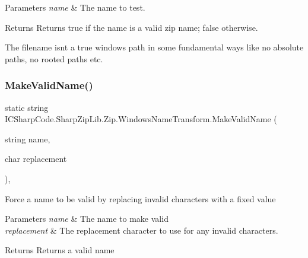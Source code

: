 \begin{DoxyParams}{Parameters}
{\em name} & The name to test.\\
\hline
\end{DoxyParams}
\begin{DoxyReturn}{Returns}
Returns true if the name is a valid zip name; false otherwise.
\end{DoxyReturn}


The filename isnt a true windows path in some fundamental ways like no absolute paths, no rooted paths etc.\mbox{\label{class_i_c_sharp_code_1_1_sharp_zip_lib_1_1_zip_1_1_windows_name_transform_af79a913adc32852ac1ba2acdc0394f69}} 
\subsubsection{\texorpdfstring{Make\+Valid\+Name()}{MakeValidName()}}
{\footnotesize\ttfamily static string I\+C\+Sharp\+Code.\+Sharp\+Zip\+Lib.\+Zip.\+Windows\+Name\+Transform.\+Make\+Valid\+Name (\begin{DoxyParamCaption}\item[{string}]{name,  }\item[{char}]{replacement }\end{DoxyParamCaption})\hspace{0.3cm}{\ttfamily [inline]}, {\ttfamily [static]}}



Force a name to be valid by replacing invalid characters with a fixed value 


\begin{DoxyParams}{Parameters}
{\em name} & The name to make valid\\
\hline
{\em replacement} & The replacement character to use for any invalid characters.\\
\hline
\end{DoxyParams}
\begin{DoxyReturn}{Returns}
Returns a valid name
\end{DoxyReturn}
\mbox{\label{class_i_c_sharp_code_1_1_sharp_zip_lib_1_1_zip_1_1_windows_name_transform_ac685f10a51ab041a6dd92da7729ff500}} 
